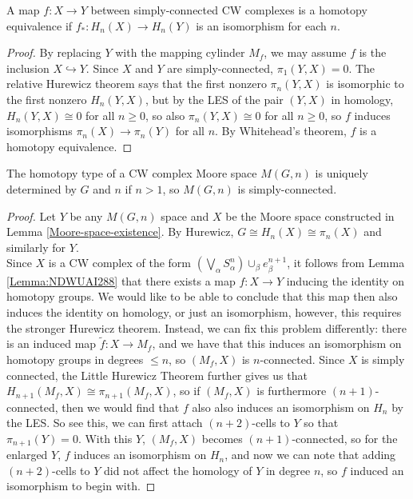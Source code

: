 \begin{corollary}
    A map $f \colon X \to Y$ between simply-connected
    CW complexes is a homotopy equivalence if
    $f_* \colon H_n (X) \to H_n(Y)$ is an isomorphism
    for each $n$.
\end{corollary}

\begin{proof}
    By replacing $Y$ with the mapping cylinder $M_f$, we
    may assume $f$ is the inclusion $X \hookrightarrow Y$.
    Since $X$ and $Y$ are simply-connected,
    $\pi_1 \left( Y,X \right) = 0$. The relative Hurewicz
    theorem says that the first nonzero $\pi_n(Y,X)$ is isomorphic
    to the first nonzero $H_n(Y,X)$, but by the LES
    of the pair $(Y,X)$ in homology,
    $H_n(Y,X) \cong 0$ for all $n\ge 0$, so
    also $\pi_n(Y,X) \cong 0$ for all $n\ge 0$, so
     $f$ induces isomorphisms
     $\pi_n(X) \to \pi_n(Y)$ for all $n$. By
     Whitehead's theorem, $f$ is a homotopy equivalence.
\end{proof}

\begin{lemma}
    The homotopy type of a CW complex Moore 
    space $M(G,n)$ is uniquely determined by $G$ and
    $n$ if $n>1$, so $M(G,n)$ is simply-connected.
\end{lemma}

\begin{proof}
    Let $Y$ be any $M(G,n)$ space and $X $ be the Moore
    space constructed in Lemma \ref{Moore-space-existence}.
    By Hurewicz,
    $G \cong H_n(X) \cong \pi_n(X)$ and
    similarly for $Y$.\\
    Since $X$ is a CW complex of the
    form $\left( \bigvee_{\alpha}S_{\alpha}^{n} \right) 
    \cup_{\beta} e_{\beta}^{n+1}$, it
    follows from Lemma \ref{Lemma:NDWUAI288} that
    there exists a map $f \colon X \to Y$ 
    inducing the identity on homotopy groups.
    We would like to be able to conclude that this
    map then also induces the identity on
    homology, or just an isomorphism, however,
    this requires the stronger Hurewicz theorem.
    Instead, we can fix this problem differently:
    there is an induced map
    $\tilde{f}  \colon X
    \to M_f$, and we have
    that this induces an isomorphism on homotopy groups
    in degrees $\le n$, so
    $\left( M_f, X \right) $ is $n$-connected.
    Since $X$ is simply connected, the Little Hurewicz Theorem
    further gives us that
    $H_{n+1} \left( M_f, X \right) \cong
    \pi_{n+1} \left( M_f, X \right) $, so
    if $\left( M_f, X \right) $ is furthermore
    $(n+1)$-connected, then we would find that
    $f$ also also induces an isomorphism on
    $H_n$ by the LES.
    So see this, we can first attach
    $(n+2)$-cells to $Y$ so that
    $\pi_{n+1}(Y) = 0$. With this $Y$,
    $\left( M_f,X \right) $ becomes $(n+1)$-connected, so
    for the enlarged $Y$, $f$ induces an
    isomorphism on $H_n$, and
    now we can note that
    adding $(n+2)$-cells to $Y$ did not affect
    the homology of $Y$ in degree $n$, so
    $f$ induced an isomorphism to begin with.
\end{proof}


